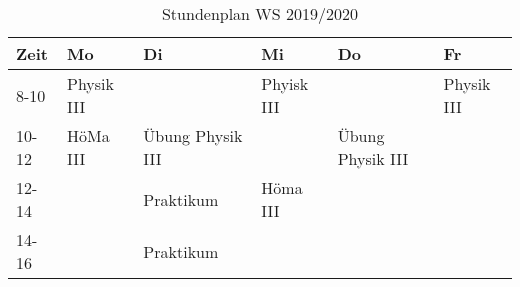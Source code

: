 \documentclass[
  captions=tableheading,
]{scrartcl}
\begin{document}
\renewcommand{\arraystretch}{2}
\begin{table}
\centering
\caption {Stundenplan WS 2019/2020}
    \begin{tabular}{p{2cm} p{2cm} p{2cm} p{2cm} p{2cm} p{2cm}}
    \toprule
    Zeit & Mo & Di & Mi & Do & Fr \\
    \midrule
    8-10 & Physik III & & Phyisk III & & Physik III \\
    10-12 & HöMa III & Übung Physik III & & Übung Physik III & \\
    12-14 & & Praktikum & Höma III & & \\
    14-16 & & Praktikum & & & \\
    \bottomrule
    \end{tabular}
\end{table}
\end{document}
